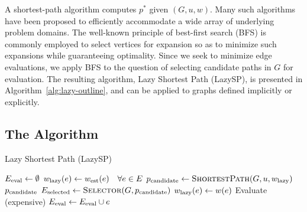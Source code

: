 A shortest-path algorithm computes $p^*$
given $(G, u, w)$.
Many such algorithms have been proposed
to efficiently accommodate a wide array of underlying problem domains.
The well-known principle of best-first search (BFS)
is commonly employed to select vertices for expansion
so as to minimize such expansions while guaranteeing optimality.
Since we seek to minimize edge evaluations,
we apply BFS to the question of selecting candidate paths in
$G$ for evaluation.
The resulting algorithm, Lazy Shortest Path (LazySP),
is presented in Algorithm~\ref{alg:lazy-outline},
and can be applied to graphs defined implicitly or explicitly.


\subsection{The Algorithm}

\begin{algorithm}[t]
\caption{Lazy Shortest Path (LazySP)}
\label{alg:lazy-outline}
\begin{algorithmic}[1]
\State $E_{\mbox{\scriptsize eval}} \leftarrow \emptyset$ %
\State $w_{\mbox{\scriptsize lazy}}(e) \leftarrow w_{\mbox{\scriptsize est}}(e) \quad \forall e \in E$ %
\Loop
   \State $p_{\mbox{\scriptsize candidate}} \leftarrow
      \mbox{\sc ShortestPath}(G, u, w_{\mbox{\scriptsize lazy}})$ %
      \label{line:lazy-outline-shortestpath}
      \State \Return $p_{\mbox{\scriptsize candidate}}$ %
   \EndIf
   \State $E_{\mbox{\scriptsize selected}} \leftarrow  \mbox{\sc Selector}(G, p_{\mbox{\scriptsize candidate}})$ %
   \label{line:lazy-outline-chooseedges} 
      \State $w_{\mbox{\scriptsize lazy}}(e) \leftarrow w(e)$ \Comment Evaluate (expensive)
      \State $E_{\mbox{\scriptsize eval}} \leftarrow E_{\mbox{\scriptsize eval}} \cup e$ %
   \EndFor
\EndLoop
\EndFunction
\end{algorithmic}
\end{algorithm}

